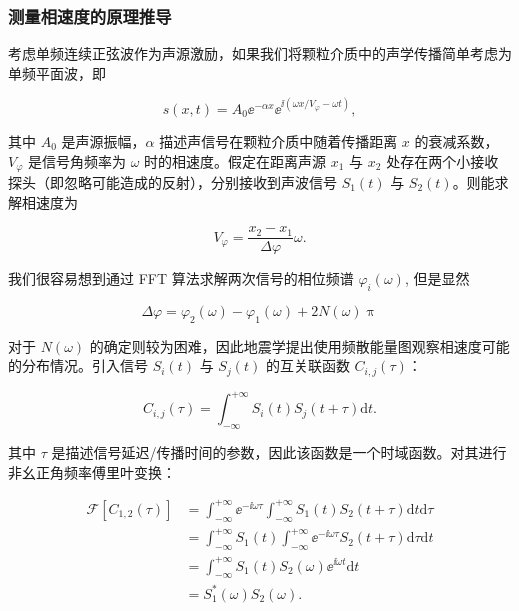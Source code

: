 \subsubsection{测量相速度的原理推导}

考虑单频连续正弦波作为声源激励，如果我们将颗粒介质中的声学传播简单考虑为单频平面波，即

\begin{equation}
  s(x,t) = A_{0}{\ee}^{-\alpha x}{\ee}^{\ii(\omega x/V_{\varphi}-\omega t)},
  \label{eq:spherical_wave}
\end{equation}

其中 $A_{0}$ 是声源振幅，$\alpha$ 描述声信号在颗粒介质中随着传播距离 $x$ 的衰减系数，$V_{\varphi}$ 是信号角频率为 $\omega$ 时的相速度。假定在距离声源 $x_{1}$ 与 $x_{2}$ 处存在两个小接收探头（即忽略可能造成的反射），分别接收到声波信号 $S_{1}(t)$ 与 $S_{2}(t)$。则能求解相速度为

\begin{equation}
  V_{\varphi} = \frac{x_{2}-x_{1}}{\Delta \varphi}\omega.
\end{equation}

我们很容易想到通过 FFT 算法求解两次信号的相位频谱 $\varphi_{i}(\omega)$, 但是显然

\begin{equation}
  \Delta \varphi = \varphi_{2}(\omega) - \varphi_{1}(\omega) + 2N(\omega)\uppi
\end{equation}

对于 $N(\omega)$ 的确定则较为困难，因此地震学提出使用频散能量图观察相速度可能的分布情况。引入信号 $S_{i}(t)$ 与 $S_{j}(t)$ 的互关联函数 $C_{i,j}(\tau)$：

\begin{equation}
  C_{i,j}(\tau) = \int_{-\infty}^{+\infty}S_{i}(t)S_{j}(t+\tau)\mathrm{d}t.
\end{equation}

其中 $\tau$ 是描述信号延迟/传播时间的参数，因此该函数是一个时域函数。对其进行非幺正角频率傅里叶变换：

\begin{align}
  \mathcal{F}[C_{1,2}(\tau)] &= \int_{-\infty}^{+\infty}{\ee}^{-\ii\omega\tau}\int_{-\infty}^{+\infty}S_{1}(t)S_{2}(t+\tau)\mathrm{d}t\mathrm{d}\tau \nonumber \\
  &= \int_{-\infty}^{+\infty}S_{1}(t)\int_{-\infty}^{+\infty}{\ee}^{-\ii\omega\tau}S_{2}(t+\tau)\mathrm{d}\tau\mathrm{d}t \nonumber \\
  &= \int_{-\infty}^{+\infty}S_{1}(t)S_{2}(\omega){\ee}^{\ii\omega t}\mathrm{d}t \nonumber \\
  &= S_{1}^{*}(\omega)S_{2}(\omega).
\end{align}

